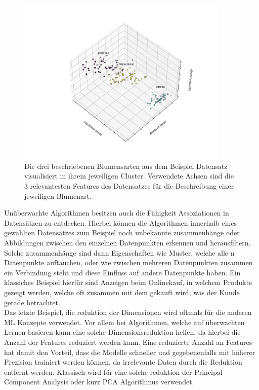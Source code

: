\documentclass[]{iat}
\begin{document}
\begin{figure}[H]
    \includegraphics[width=0.9\textwidth]{graphics/iris_set_groundtruth.png}
    \centering
    \caption{Die drei beschriebenen Blumensarten aus dem Beispiel Datensatz visualisiert in ihrem jeweiligen Cluster. Verwendete Achsen sind die 3 relevantesten Features des Datensatzes für die Beschreibung einer jeweiligen Blumenart.}
    \label{abb:flower_example}
\end{figure}
Unüberwachte Algorithmen besitzen auch die Fähigkeit Assoziationen in Datensätzen zu entdecken. Hierbei können die Algorithmen innerhalb eines gewählten Datensatzes zum Beispiel noch unbekannte zusammenhänge oder Abbildungen zwischen den einzelnen Datenpunkten erkennen und herausfiltern. Solche zusammenhänge sind dann Eigenschaften wie Muster, welche alle n Datenpunkte auftauchen, oder wie zwischen mehreren Datenpunkten zusammen ein Verbindung steht und diese Einfluss auf andere Datenpunkte haben. Ein klassiches Beispiel hierfür sind Anzeigen beim Onlinekauf, in welchem Produkte gezeigt werden, welche oft zusammen mit dem gekauft wird, was der Kunde gerade betrachtet.\\
Das letzte Beispiel, die reduktion der Dimensionen wird oftmals für die anderen ML Konzepte verwendet. Vor allem bei Algorithmen, welche auf überwachten Lernen basieren kann eine solche Dimensionsreduktion helfen, da hierbei die Anzahl der Features reduziert werden kann. Eine reduzierte Anzahl an Features hat damit den Vorteil, dass die Modelle schneller und gegebenenfalls mit höherer Prezision trainiert werden können, da irrelevante Daten durch die Reduktion entfernt werden. Klassisch wird für eine solche reduktion der Principal Component Analysis oder kurz PCA Algorithmus verwendet.
\end{document}
